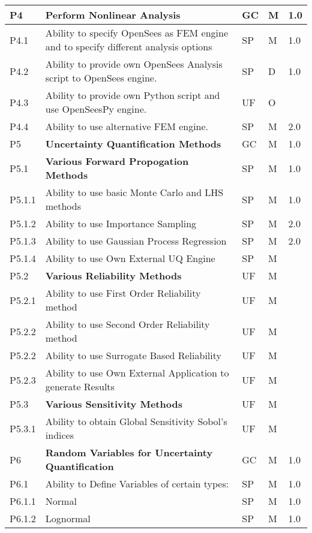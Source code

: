 \begin{longtable}{| p{} | p{} | p{} | p{} |  p{} |}
  
  P4 & \textbf{Perform Nonlinear Analysis} & GC & M & 1.0 \\ \hline
  P4.1 & Ability to specify OpenSees as FEM engine and to specify different analysis options & SP & M & 1.0 \\ \hline
  P4.2 & Ability to provide own OpenSees Analysis script to OpenSees engine. & SP & D & 1.0 \\ \hline
  P4.3 & Ability to provide own Python script and use OpenSeesPy engine. & UF & O &  \\ \hline
  P4.4 & Ability to use alternative FEM engine. & SP & M & 2.0 \\ \hline
  P5 & \textbf{Uncertainty Quantification Methods} &  GC & M & 1.0  \\ \hline
  P5.1 & \textbf{Various Forward Propogation Methods} & SP & M & 1.0  \\ \hline
  P5.1.1 & Ability to use basic  Monte Carlo and LHS methods & SP & M & 1.0 \\ \hline
  P5.1.2 & Ability to use Importance Sampling  & SP & M & 2.0 \\ \hline
  P5.1.3 & Ability to use Gaussian Process Regression & SP & M & 2.0 \\ \hline
  P5.1.4 & Ability to use Own External UQ Engine & SP & M &  \\ \hline
  P5.2 & \textbf{Various Reliability Methods} & UF & M &  \\ \hline
  P5.2.1 & Ability to use First Order Reliability method & UF & M &  \\ \hline
  P5.2.2 & Ability to use Second Order Reliability method & UF & M & \\ \hline
  P5.2.2 & Ability to use Surrogate Based Reliability & UF & M & \\ \hline
  P5.2.3 & Ability to use Own External Application to generate Results & UF & M &  \\ \hline
  P5.3 & \textbf{Various Sensitivity Methods} & UF & M &  \\ \hline
  P5.3.1 & Ability to obtain Global Sensitivity Sobol's indices & UF & M &  \\ \hline
   P6 & \textbf{Random Variables for Uncertainty Quantification} & GC & M & 1.0  \\ \hline
   P6.1 & Ability to Define Variables of certain types: & SP & M & 1.0  \\ 
   P6.1.1 & Normal & SP & M  & 1.0 \\ \hline
    P6.1.2 & Lognormal & SP & M & 1.0 \\ \hline

\end{longtable}
